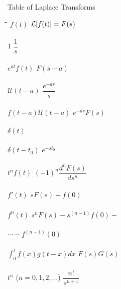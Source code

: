 \pagebreak
{}

\pagestyle{empty}

\begin{center}
	\begin{LARGE}
		Table of Laplace Transforms
	\end{LARGE}
\end{center}

\vspace{2ex}

\renewcommand{\arraystretch}{1.5}
\begin{multicols}{2}
	\begin{center}
		\begin{tabbing}
			\hspace*{1.5 in}\=\hspace{1.5in}\= \kill
			$f(t)$ \> $\mathcal{L}{\left[f(t)\right]}=F(s)$ \> \\ \\
			$1$       			 \> $\dfrac{1}{s}$           \>\LTNUM \\ \\
			$e^{at}f(t)$	\> $F(s-a)$	\>\LTNUM \\ \\ 
			$\mathcal{U}(t-a)$ \> $\dfrac{e^{-as}}{s}$ \>\LTNUM \\ \\
			$f(t-a)\mathcal{U}(t-a)$ \> $e^{-as}F(s)$ \>\LTNUM \\ \\
			$\delta(t)$	 \> \LTNUM \\ \\
			$\delta(t-t_0)$ \> $e^{-st_0}$ \>\LTNUM \\ \\
			$t^nf(t)$ 	\> $(-1)^n\dfrac{d^nF(s)}{ds^n}$  \>\LTNUM \\ \\
			$f'(t)$ 	\> $sF(s) - f(0)$ \>\LTNUM \\ \\
			$f^{n}(t)$ 	\> $s^nF(s) - s^{(n-1)} f(0) - $ \\ \\
			\> $\cdots - f^{(n-1)}(0)$ \>\LTNUM \\ \\
			$\displaystyle{\int_0^t f(x)g(t-x)dx}$ \> $F(s)G(s)$ \>\LTNUM \\ \\
			$t^n$ ($n=0,1,2,\dots$)     \> $\dfrac{n!}{s^{n+1}}$    \>\LTNUM \\ \\

\end{tabbing}
\end{center}
\end{multicols}
